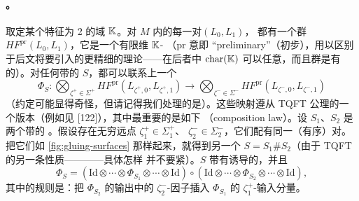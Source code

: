 \paragraph{\trFloerCohomology。}\label{sub:floer-cohomology}
取定某个特征为 2 的域 $\mathbb{K}$。对 $M$ 内的每一对\trExact\trLagrange\trSubmanifold{}$(L_0,L_1)$，
都有一个\trFloerCohomology{}群 $HF^{\mathrm{pr}}(L_0,L_1)$，它是一个有限维 $\mathbb{K}$-\trVectorSpace
（pr 意即 “preliminary”（初步），用以区别于后文将要引入的更精细的理论——在后者中%
$\mathrm{char}(\mathbb{K})$ 可以任意，而且\trFloer{}群是有\trGraded{}的）。对任何带\trLagrange\trLabel{}的%
\trPointedBoundary\trRiemann\trSurface{}$S$，都可以联系上一个\trHomomorphism
\begin{equation}\label{eq:tqft-operation}
\Phi_S\colon
\bigotimes_{\zeta^+\in\Sigma^+}HF^{\mathrm{pr}}(L_{\zeta^+,0},L_{\zeta^+,1})
\longrightarrow
\bigotimes_{\zeta^-\in\Sigma^-}HF^{\mathrm{pr}}(L_{\zeta^-,0},L_{\zeta^-,1})
\end{equation}
（\trContravariant{}约定可能显得奇怪，但请记得我们处理的是\trFloerCohomology）。这些映射遵从%
\trOpenString{} TQFT 公理的一个版本（例如见 [122]），其中最重要的是如下%
\textbf{\trCompositionLaw}（composition law）。设 $S_1$、$S_2$ 是两个带\trLagrange\trLabel{}的%
\trPointedBoundary\trRiemann\trSurface。假设存在无穷远点 $\zeta_1^+\in\Sigma_1^+$、
$\zeta_2^-\in\Sigma_2^-$，它们配有同一（有序）\trLagrange\trSubmanifold{}对。把它们如%
\cref{fig:gluing-surfaces} 那样\trGluing{}起来，就得到另一个\trPointedBoundary\trRiemann\trSurface%
$S=S_1\#S_2$（由于 TQFT 的另一条性质——\emph{\trTopology\trInvariance}——具体怎样\trGluing{}%
并不要紧）。$S$ 带有诱导的\trLagrange\trLabel，并且
\begin{equation}\label{eq:composition-law}
\Phi_S=(\mathrm{Id}\otimes\cdots\otimes\Phi_{S_1}\otimes\cdots\otimes\mathrm{Id})\circ
(\mathrm{Id}\otimes\cdots\otimes\Phi_{S_2}\otimes\cdots\otimes\mathrm{Id}),
\end{equation}
其中的规则是：把 $\Phi_{S_2}$ 的输出中的 $\zeta_2^-$-因子插入 $\Phi_{S_1}$ 的
$\zeta_1^+$-输入分量。
